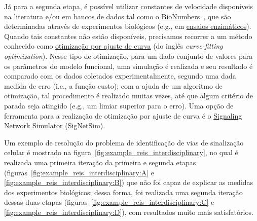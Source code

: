 \documentclass[12pt]{article}
\begin{document}
Já para a segunda etapa, é possível utilizar constantes de velocidade disponíveis na literatura e/ou em bancos de dados tal como o \href{http://bionumbers.hms.harvard.edu/}{BioNumbers}~\cite{milo2009bionumbers}, que são determinadas através de experimentos biológicos (e.g., em \href{https://en.wikipedia.org/wiki/Enzyme\_assay}{ensaios enzimáticos}). Quando tais constantes não estão disponíveis, precisamos recorrer a um método conhecido como \href{https://en.wikipedia.org/wiki/Curve\_fitting}{otimização por ajuste de curva} (do inglês \emph{curve-fitting optimization}). Nesse tipo de otimização, para um dado conjunto de valores para os parâmetros do modelo funcional, uma simulação é realizada e seu resultado é comparado com os dados coletados experimentalmente, segundo uma dada medida de erro (i.e., a função custo); com a ajuda de um algoritmo de otimização, tal procedimento é realizado muitas vezes, até que algum critério de parada seja atingido (e.g., um limiar superior para o erro). Uma opção de ferramenta para a realização de otimização por ajuste de curva é o \href{https://github.com/vincent-noel/SigNetSim}{Signaling Network Simulator (SigNetSim)}.

Um exemplo de resolução do problema de identificação de vias de sinalização celular é mostrado na figura~\ref{fig:example_reis_interdisciplinary}, no qual é realizada uma primeira iteração da primeira e segunda etapas (figuras~\ref{fig:example_reis_interdisciplinary:A} e \ref{fig:example_reis_interdisciplinary:B}) que não foi capaz de explicar as medidas dos experimentos biológicos; dessa forma, foi realizada uma segunda iteração dessas duas etapas (figuras~\ref{fig:example_reis_interdisciplinary:C} e \ref{fig:example_reis_interdisciplinary:D}), com resultados muito mais satisfatórios.
\end{document}
